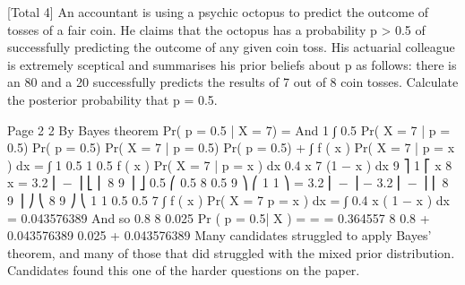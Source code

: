 
[Total 4]
An accountant is using a psychic octopus to predict the outcome of tosses of a fair
coin. He claims that the octopus has a probability p > 0.5 of successfully predicting
the outcome of any given coin toss. His actuarial colleague is extremely sceptical and
summarises his prior beliefs about p as follows: there is an 80%
and a 20%
successfully predicts the results of 7 out of 8 coin tosses.
Calculate the posterior probability that p = 0.5.

Page 2%
2
By Bayes theorem
Pr( p = 0.5 | X = 7) =
And
1
∫ 0.5
Pr( X = 7 | p = 0.5) \times  Pr( p = 0.5)
Pr( X = 7 | p = 0.5) \times  Pr( p = 0.5) + ∫
f ( x ) Pr( X = 7 | p = x ) dx = ∫
1
0.5
1
0.5
f ( x ) Pr( X = 7 | p = x ) dx
0.4  \times  x 7 (1 − x ) dx
9 ⎤ 1
⎡ x 8 x
= 3.2 ⎢ − ⎥
⎣ ⎢ 8 9 ⎥ ⎦ 0.5
⎛ 0.5 8 0.5 9 ⎞
⎛ 1 1 ⎞
= 3.2 ⎜ − ⎟ − 3.2 ⎜
−
⎟
⎜ 8
9 ⎟ ⎠
⎝ 8 9 ⎠
⎝
1 1
0.5 0.5
7
∫ f ( x ) Pr( X = 7 p = x ) dx = ∫ 0.4  \times  x ( 1 − x ) dx
= 0.043576389
And so
0.8   8
0.025
Pr ( p = 0.5| X ) =
=
= 0.364557
8
0.8   + 0.043576389 0.025 + 0.043576389
Many candidates struggled to apply Bayes’ theorem, and many of those that did struggled
with the mixed prior distribution. Candidates found this one of the harder questions on the
paper.
